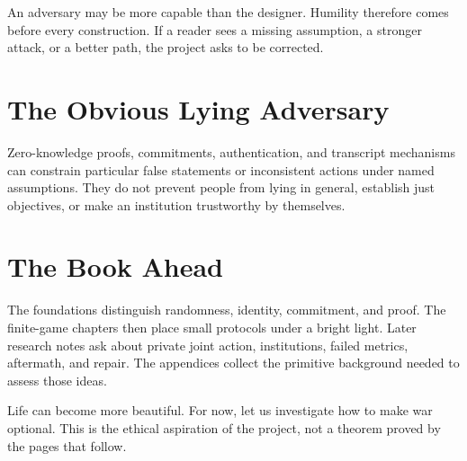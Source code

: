 An adversary may be more capable than the designer. Humility therefore comes
before every construction. If a reader sees a missing assumption, a stronger
attack, or a better path, the project asks to be corrected.

\section{The Obvious Lying Adversary}

Zero-knowledge proofs, commitments, authentication, and transcript mechanisms
can constrain particular false statements or inconsistent actions under named
assumptions. They do not prevent people from lying in general, establish just
objectives, or make an institution trustworthy by themselves.

\section{The Book Ahead}

The foundations distinguish randomness, identity, commitment, and proof. The
finite-game chapters then place small protocols under a bright light. Later
research notes ask about private joint action, institutions, failed metrics,
aftermath, and repair. The appendices collect the primitive background needed
to assess those ideas.

Life can become more beautiful. For now, let us investigate how to make war
optional. This is the ethical aspiration of the project, not a theorem proved
by the pages that follow.
